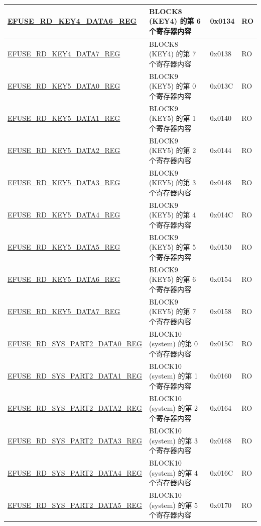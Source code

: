 \begin{longtable}{ | p{6.8cm} | p{7cm} | p{1.3cm} | p{1.2cm} | }
\hyperref[regdesc:EFUSERDKEY4DATA6REG]{EFUSE\_RD\_KEY4\_DATA6\_REG} & BLOCK8 (KEY4) 的第 6 个寄存器内容 & 0x0134 & RO \\ \hline
\hyperref[regdesc:EFUSERDKEY4DATA7REG]{EFUSE\_RD\_KEY4\_DATA7\_REG} & BLOCK8 (KEY4) 的第 7 个寄存器内容 & 0x0138 & RO \\ \hline
\hyperref[regdesc:EFUSERDKEY5DATA0REG]{EFUSE\_RD\_KEY5\_DATA0\_REG} & BLOCK9 (KEY5) 的第 0 个寄存器内容 & 0x013C & RO \\ \hline
\hyperref[regdesc:EFUSERDKEY5DATA1REG]{EFUSE\_RD\_KEY5\_DATA1\_REG} & BLOCK9 (KEY5) 的第 1 个寄存器内容 & 0x0140 & RO \\ \hline
\hyperref[regdesc:EFUSERDKEY5DATA2REG]{EFUSE\_RD\_KEY5\_DATA2\_REG} & BLOCK9 (KEY5) 的第 2 个寄存器内容 & 0x0144 & RO \\ \hline
\hyperref[regdesc:EFUSERDKEY5DATA3REG]{EFUSE\_RD\_KEY5\_DATA3\_REG} & BLOCK9 (KEY5) 的第 3 个寄存器内容 & 0x0148 & RO \\ \hline
\hyperref[regdesc:EFUSERDKEY5DATA4REG]{EFUSE\_RD\_KEY5\_DATA4\_REG} & BLOCK9 (KEY5) 的第 4 个寄存器内容 & 0x014C & RO \\ \hline
\hyperref[regdesc:EFUSERDKEY5DATA5REG]{EFUSE\_RD\_KEY5\_DATA5\_REG} & BLOCK9 (KEY5) 的第 5 个寄存器内容 & 0x0150 & RO \\ \hline
\hyperref[regdesc:EFUSERDKEY5DATA6REG]{EFUSE\_RD\_KEY5\_DATA6\_REG} & BLOCK9 (KEY5) 的第 6 个寄存器内容 & 0x0154 & RO \\ \hline
\hyperref[regdesc:EFUSERDKEY5DATA7REG]{EFUSE\_RD\_KEY5\_DATA7\_REG} & BLOCK9 (KEY5) 的第 7 个寄存器内容 & 0x0158 & RO \\ \hline
\hyperref[regdesc:EFUSERDSYSPART2DATA0REG]{EFUSE\_RD\_SYS\_PART2\_DATA0\_REG} & BLOCK10 (system) 的第 0 个寄存器内容 & 0x015C & RO \\ \hline
\hyperref[regdesc:EFUSERDSYSPART2DATA1REG]{EFUSE\_RD\_SYS\_PART2\_DATA1\_REG} & BLOCK10 (system) 的第 1 个寄存器内容 & 0x0160 & RO \\ \hline
\hyperref[regdesc:EFUSERDSYSPART2DATA2REG]{EFUSE\_RD\_SYS\_PART2\_DATA2\_REG} & BLOCK10 (system) 的第 2 个寄存器内容 & 0x0164 & RO \\ \hline
\hyperref[regdesc:EFUSERDSYSPART2DATA3REG]{EFUSE\_RD\_SYS\_PART2\_DATA3\_REG} & BLOCK10 (system) 的第 3 个寄存器内容 & 0x0168 & RO \\ \hline
\hyperref[regdesc:EFUSERDSYSPART2DATA4REG]{EFUSE\_RD\_SYS\_PART2\_DATA4\_REG} & BLOCK10 (system) 的第 4 个寄存器内容 & 0x016C & RO \\ \hline
\hyperref[regdesc:EFUSERDSYSPART2DATA5REG]{EFUSE\_RD\_SYS\_PART2\_DATA5\_REG} & BLOCK10 (system) 的第 5 个寄存器内容 & 0x0170 & RO \\ \hline

\end{longtable}
